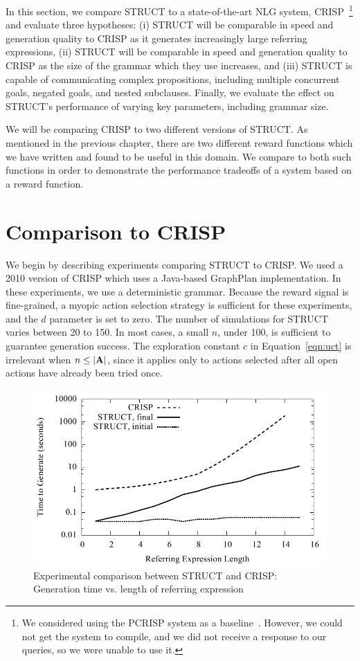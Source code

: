 In this section, we compare STRUCT to a state-of-the-art NLG system,
CRISP~\footnote{We considered using the PCRISP system as a
  baseline~\cite{bauer_sentence_2010}. However, we could not get the system to
  compile, and we did not receive a response to our queries, so we were
  unable to use it.}
and evaluate three hypotheses: (i) STRUCT will be
comparable in speed and generation quality to CRISP as it generates
increasingly large referring expressions, (ii) STRUCT will be
comparable in speed and generation quality to CRISP as the size of the
grammar which they use increases, and (iii) STRUCT is capable of
communicating complex propositions, including multiple concurrent
goals, negated goals, and nested subclauses.
Finally, we evaluate the effect on STRUCT's performance 
of varying key parameters, including grammar size.

We will be comparing CRISP to two different versions of STRUCT.
As mentioned in the previous chapter, there are two different reward
functions which we have written and found to be useful in this
domain.  We compare to both such functions in order to demonstrate
the performance tradeoffs of a system based on a reward function.

\section{Comparison to CRISP}

We begin by describing experiments comparing STRUCT to CRISP. We used a
2010 version of CRISP  which uses a Java-based GraphPlan
implementation. In these
experiments, we use a deterministic grammar.
Because the reward signal is fine-grained,
 a myopic action selection strategy is
sufficient for these experiments, and 
the $d$ parameter is set to zero. The
number of simulations for STRUCT varies between 20 to 150.
In most cases, a small $n$, under 100, is sufficient
to guarantee generation success.  The exploration constant $c$ in
Equation~\ref{eqn:uct} is irrelevant when $n \leq |\bf{A}|$, since it
applies only to actions selected after all open actions have already
been tried once.

\begin{figure}
\includegraphics[width=0.7 \linewidth ]{../analysis/plots/complex-goal/complex-goal.pdf}
\caption{Experimental comparison between STRUCT and  CRISP: 
Generation time vs. length of referring expression }
\label{crisp-comparison-gentime}
\end{figure}

